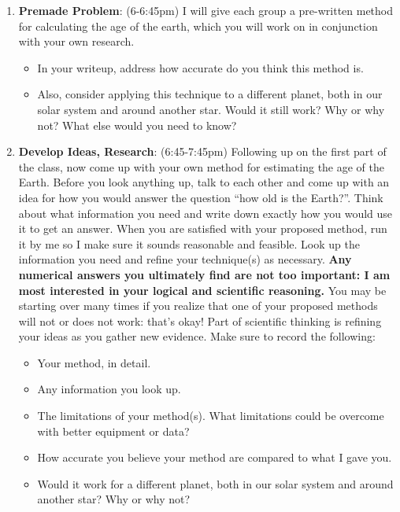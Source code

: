 \documentclass[12pt]{article}%
\begin{document}
\begin{enumerate}

    \item \textbf{Premade Problem}: (6-6:45pm) I will give each group a pre-written method for calculating the age of the earth, which you will work on in conjunction with your own research. 
    \begin{itemize}
        \item In your writeup, address how accurate do you think this method is.
        \item Also, consider applying this technique to a different planet, both in our solar system and around another star. Would it still work? Why or why not? What else would you need to know?
    \end{itemize} 
    
    \item \textbf{Develop Ideas, Research}: (6:45-7:45pm) Following up on the first part of the class, now come up with your own method for estimating the age of the Earth. Before you look anything up, talk to each other and come up with an idea for how you would answer the question ``how old is the Earth?''.   Think about what information you need and write down exactly how you would use it to get an answer. When you are satisfied with your proposed method, run it by me so I make sure it sounds reasonable and feasible. Look up the information you need and refine your technique(s) as necessary. \textbf{Any numerical answers you ultimately find are not too important: I am most interested in your logical and scientific reasoning.} You may be starting over many times if you realize that one of your proposed methods will not or does not work: that's okay! Part of scientific thinking is refining your ideas as you gather new evidence. Make sure to record the following:
    \begin{itemize}
        \item Your method, in detail.
        \item Any information you look up.
        \item The limitations of your method(s). What limitations could be overcome with better equipment or data?
        
        \item How accurate you believe your method are compared to what I gave you.
        \item Would it work for a different planet, both in our solar system and around another star? Why or why not?
    \end{itemize}  


\end{enumerate}
\end{document}
